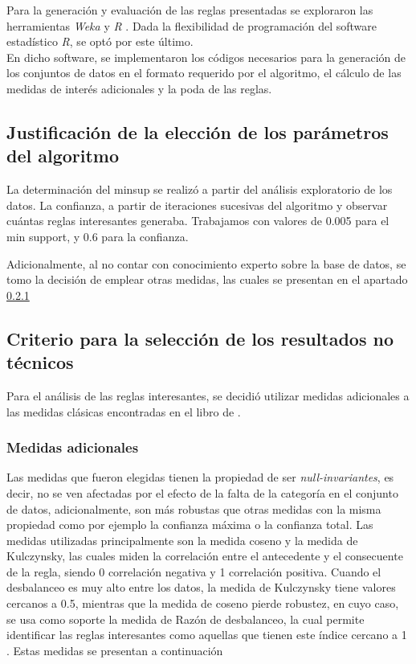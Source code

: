 \documentclass[]{article}
\begin{document}
	Para la generación y evaluación de las reglas presentadas se exploraron las herramientas \textit{Weka} \cite{Weka1} y \textit{R} \cite{RCran}. Dada la flexibilidad de programación del software estadístico \textit{R}, se optó por este último.\\
	
	En dicho software, se implementaron los códigos necesarios para la generación de los conjuntos de datos en el formato requerido por el algoritmo, el cálculo de las medidas de interés adicionales y la poda de las reglas.
	
	\subsection{Justificación de la elección de los parámetros del algoritmo}
	La determinación del minsup se realizó a partir del análisis exploratorio de los datos. La confianza, a partir de iteraciones sucesivas del algoritmo y observar cuántas reglas interesantes generaba. Trabajamos con valores de 0.005 para el min support, y 0.6 para la confianza.%
	
	Adicionalmente, al no contar con conocimiento experto sobre la base de datos, se tomo la decisión de emplear otras medidas, las cuales se presentan en el apartado \ref{Medidas} 
	
	\subsection{Criterio para la selección de los resultados no técnicos}
	
	Para el análisis de las reglas interesantes, se decidió utilizar medidas adicionales a las medidas clásicas encontradas en el libro de \cite{Tan:2005:IDM:1095618}.
	
	\subsubsection{Medidas adicionales} \label{Medidas}
	Las medidas que fueron elegidas tienen la propiedad de ser \textit{null-invariantes}, es decir, no se ven afectadas por el efecto de la falta de la categoría en el conjunto de datos, adicionalmente, son más robustas que otras medidas con la misma propiedad como por ejemplo la confianza máxima o la confianza total. Las medidas utilizadas principalmente son la medida coseno y la medida de Kulczynsky, las cuales miden la correlación entre el antecedente y el consecuente de la regla, siendo 0 correlación negativa y 1 correlación positiva. Cuando el desbalanceo es muy alto entre los datos, la medida de Kulczynsky tiene valores cercanos a 0.5, mientras que la medida de coseno pierde robustez, en cuyo caso, se usa como soporte la medida de Razón de desbalanceo, la cual permite identificar las reglas interesantes como aquellas que tienen este índice cercano a 1 \cite{Hall:2009:WDM:1656274.1656278}. Estas medidas se presentan a continuación\\
	
\end{document}
